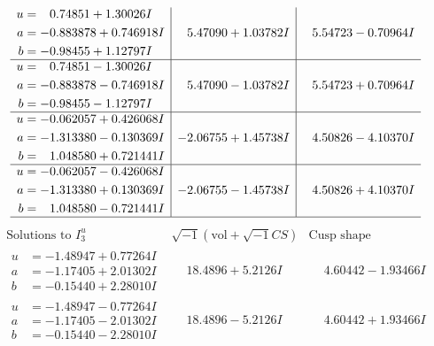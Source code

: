 \documentclass[1p]{elsarticle_modified}
\theoremstyle{definition}
\newcommand{\I}{\sqrt{-1}}
\begin{document}
$$\begin{array}{c|c|c}
\begin{aligned}
u &= \phantom{-}0.74851 + 1.30026 I \\
a &= -0.883878 + 0.746918 I \\
b &= -0.98455 + 1.12797 I\end{aligned}
 & \phantom{-}5.47090 + 1.03782 I & \phantom{-}5.54723 - 0.70964 I \\ \hline\begin{aligned}
u &= \phantom{-}0.74851 - 1.30026 I \\
a &= -0.883878 - 0.746918 I \\
b &= -0.98455 - 1.12797 I\end{aligned}
 & \phantom{-}5.47090 - 1.03782 I & \phantom{-}5.54723 + 0.70964 I \\ \hline\begin{aligned}
u &= -0.062057 + 0.426068 I \\
a &= -1.313380 - 0.130369 I \\
b &= \phantom{-}1.048580 + 0.721441 I\end{aligned}
 & -2.06755 + 1.45738 I & \phantom{-}4.50826 - 4.10370 I \\ \hline\begin{aligned}
u &= -0.062057 - 0.426068 I \\
a &= -1.313380 + 0.130369 I \\
b &= \phantom{-}1.048580 - 0.721441 I\end{aligned}
 & -2.06755 - 1.45738 I & \phantom{-}4.50826 + 4.10370 I\\
 \hline 
 \end{array}$$\newpage$$\begin{array}{c|c|c}  
\text{Solutions to }I^u_{3}& \I (\text{vol} + \sqrt{-1}CS) & \text{Cusp shape}\\
 \hline 
\begin{aligned}
u &= -1.48947 + 0.77264 I \\
a &= -1.17405 + 2.01302 I \\
b &= -0.15440 + 2.28010 I\end{aligned}
 & \phantom{-}18.4896 + 5.2126 I & \phantom{-}4.60442 - 1.93466 I \\ \hline\begin{aligned}
u &= -1.48947 - 0.77264 I \\
a &= -1.17405 - 2.01302 I \\
b &= -0.15440 - 2.28010 I\end{aligned}
 & \phantom{-}18.4896 - 5.2126 I & \phantom{-}4.60442 + 1.93466 I \\ \hline\begin{aligned}

\end{aligned}
\end{array}$$
\end{document}
